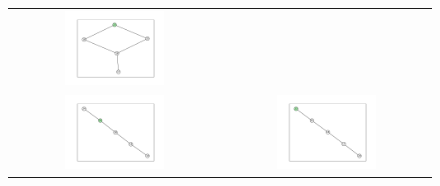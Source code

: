 \documentclass[12pt, a4paper]{extarticle}
\begin{document}
\begin{figure}
\begin{tabularx}{\textwidth}{cc}
\includegraphics[width=0.5\textwidth]{task11-graphlets/5_16-17-18-25-23.pdf} \\
\includegraphics[width=0.5\textwidth]{task11-graphlets/5_10-16-18-23-24.pdf} &
\includegraphics[width=0.5\textwidth]{task11-graphlets/5_16-17-25-20-23.pdf} \\
\end{tabularx}\end{figure}
\end{document}
